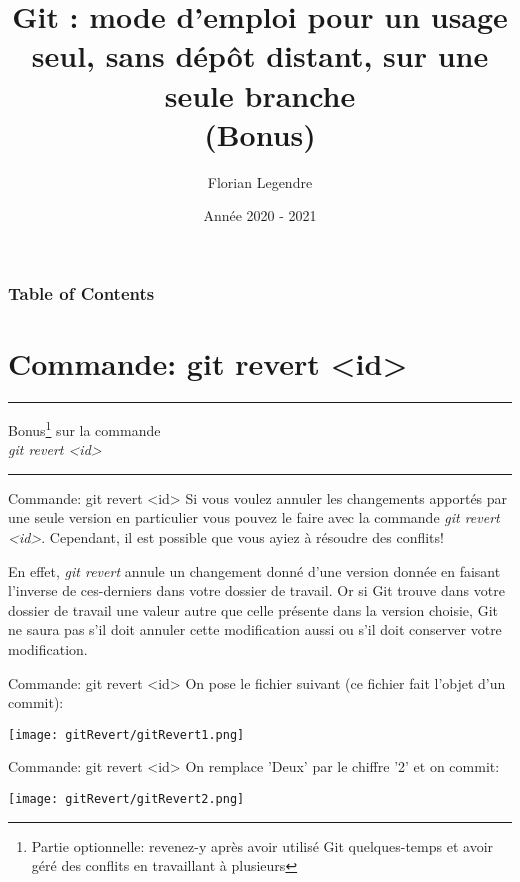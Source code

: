 \documentclass{beamer}
\title[Git seul en local mono-branche (Bonus)]{Git : mode d'emploi pour un usage seul, sans dépôt distant, sur une seule branche\\ (Bonus)}
\author{Florian Legendre}
\institute{Université de Poitiers}
\date{Année 2020 - 2021}
\begin{document}
\frame{\titlepage}

\begin{frame}
\frametitle{Table of Contents}
\tableofcontents[hideallsubsections]
\end{frame}


\section{Commande: git revert <id>}


\begin{frame}
\huge
\begin{center}
\hrule
\bigskip
Bonus\footnote[frame]{Partie optionnelle: revenez-y après avoir utilisé Git quelques-temps et avoir géré des conflits en travaillant à plusieurs} sur la commande\\ \textit{git revert <id>}
\bigskip
\hrule
\end{center}
\normalsize
\end{frame}

\begin{frame}{Commande: git revert <id>}
Si vous voulez annuler les changements apportés par une seule version en particulier vous pouvez le faire avec la commande \textit{git revert <id>}. Cependant, il est possible que vous ayiez à résoudre des conflits!\\
\medskip

En effet, \textit{git revert} annule un changement donné d'une version donnée en faisant l'inverse de ces-derniers dans votre dossier de travail. Or si Git trouve dans votre dossier de travail une valeur autre que celle présente dans la version choisie, Git ne saura pas s'il doit annuler cette modification aussi ou s'il doit conserver votre modification.
\end{frame}

\begin{frame}{Commande: git revert <id>}
On pose le fichier suivant (ce fichier fait l'objet d'un commit):
\begin{center}
	\texttt{[image: gitRevert/gitRevert1.png]}
\end{center}
\end{frame}

\begin{frame}{Commande: git revert <id>}
On remplace 'Deux' par le chiffre '2' et on commit:
\begin{center}
	\texttt{[image: gitRevert/gitRevert2.png]}
\end{center}
\end{frame}
\end{document}
